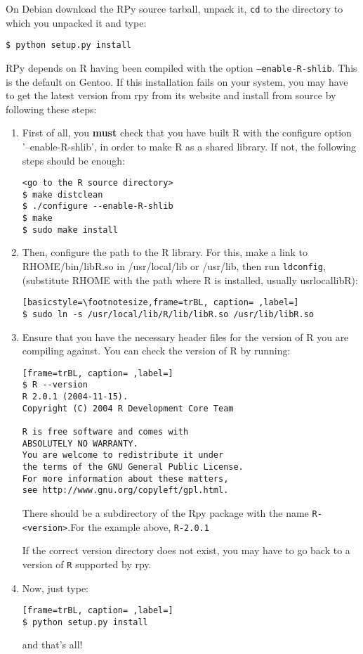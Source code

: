 On Debian download the RPy source tarball, unpack it, \texttt{cd} to the directory to which you unpacked it and type:
\begin{lstlisting}[frame=trBL, caption=Installing RPy on Debian GNU/Linux ,label=lst:instRPyd]
$ python setup.py install
\end{lstlisting}
RPy depends on R having been compiled with the option \texttt{--enable-R-shlib}. This is the default on Gentoo. If this installation fails on your system, you may have to get the latest version from rpy from its website and install from source by following these steps:
\begin{enumerate}
\item First of all, you \textbf{must} check that you have built R with the configure
    option '--enable-R-shlib', in order to make R as a shared library.  If
    not, the following steps should be enough:
\begin{lstlisting}[frame=trBL, caption=Building R from source ,label=lst:rfs]
 <go to the R source directory>
$ make distclean
$ ./configure --enable-R-shlib
$ make
$ sudo make install
\end{lstlisting}
 


\item Then, configure the path to the R library. For this, make a link to RHOME/bin/libR.so in /usr/local/lib or /usr/lib, then run \texttt{ldconfig},  (substitute RHOME with the path where R is installed, usually
    \/usr\/local\/lib\/R):
\begin{lstlisting}[basicstyle=\footnotesize,frame=trBL, caption= ,label=]
$ sudo ln -s /usr/local/lib/R/lib/libR.so /usr/lib/libR.so
\end{lstlisting}

\item Ensure that you have the necessary header files for the version of R you are 
    compiling against.  You can check the version of R by running:
\begin{lstlisting}[frame=trBL, caption= ,label=]
$ R --version
R 2.0.1 (2004-11-15).
Copyright (C) 2004 R Development Core Team

R is free software and comes with
ABSOLUTELY NO WARRANTY.
You are welcome to redistribute it under 
the terms of the GNU General Public License.  
For more information about these matters,
see http://www.gnu.org/copyleft/gpl.html.
\end{lstlisting}


    There should be a subdirectory of the Rpy package with the name
\texttt{R-<version>}.For the example above, \texttt{R-2.0.1}

    If the correct version directory does not exist, you may have to go back to a version of \texttt{R} supported by rpy.


\item Now, just type:
\begin{lstlisting}[frame=trBL, caption= ,label=]
$ python setup.py install
\end{lstlisting}
       

    and that's all!

\end{enumerate}



